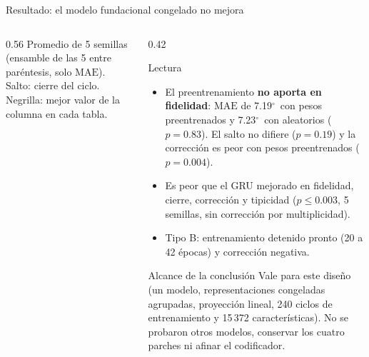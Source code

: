 \documentclass[aspectratio=169,10pt,t]{beamer}
\newcommand{\gr}{$^\circ$}
\newcommand{\mae}{\ensuremath{\mathrm{MAE}}}
\begin{document}
\begin{frame}{Resultado: el modelo fundacional congelado no mejora}
\begin{columns}[T]
\begin{column}{0.56\textwidth}
\vspace{3pt}
{\scriptsize Promedio de 5 semillas (ensamble de las 5 entre paréntesis, solo \mae{}). Salto: cierre del ciclo. Negrilla: mejor valor de la columna en cada tabla.}
\end{column}
\begin{column}{0.42\textwidth}
\begin{alertblock}{Lectura}\scriptsize
\begin{itemize}\setlength{\itemsep}{2pt}
\item El preentrenamiento \textbf{no aporta en fidelidad}: \mae{} de 7.19\gr\ con pesos preentrenados y 7.23\gr\ con aleatorios ($p=0.83$). El salto no difiere ($p=0.19$) y la corrección es peor con pesos preentrenados ($p=0.004$).
\item Es peor que el GRU mejorado en fidelidad, cierre, corrección y tipicidad ($p\le0.003$, 5 semillas, sin corrección por multiplicidad).
\item Tipo B: entrenamiento detenido pronto (20 a 42 épocas) y corrección negativa.
\end{itemize}
\end{alertblock}
\begin{block}{Alcance de la conclusión}\scriptsize
Vale para este diseño (un modelo, representaciones congeladas agrupadas, proyección lineal, 240 ciclos de entrenamiento y 15\,372 características). No se probaron otros modelos, conservar los cuatro parches ni afinar el codificador.
\end{block}
\end{column}
\end{columns}
\end{frame}
\end{document}
